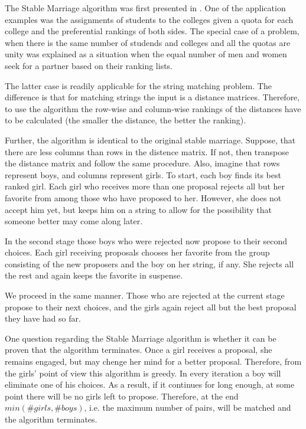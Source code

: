\documentclass[a4paper,11pt]{article}
\begin{document}
The Stable Marriage algorithm was first presented in \cite{gale}. One of the application examples was the assignments of students to the colleges given a quota for each college and the preferential rankings of both sides. The special case of a problem, when there is the same number of studends and colleges and all the quotas are unity was explained as a situation when the equal number of men and women seek for a partner based on their ranking lists.

The latter case is readily applicable for the string matching problem. The difference is that for matching strings the input is a distance matrices. Therefore, to use the algorithm the row-wise and column-wise rankings of the distances have to be calculated (the smaller the distance, the better the ranking).

Further, the algorithm is identical to the original stable marriage. Suppose, that there are less columns than rows in the distence matrix. If not, then transpose the distance matrix and follow the same procedure. Also, imagine that rows represent boys, and columns represent girls. To start, each boy finds its best ranked girl. Each girl who receives more than one proposal rejects all but her favorite from among those who have proposed to her. However, she does not accept him yet, but keeps him on a string to allow for the possibility that someone better may come along later.

In the second stage those boys who were rejected now propose to their second choices. Each girl receiving proposals chooses her favorite from the group consisting of the new proposers and the boy on her string, if any. She rejects all the rest and again keeps the favorite in suspense.

We proceed in the same manner. Those who are rejected at the current stage propose to their next choices, and the girls again reject all but the best proposal they have had so far.

One question regarding the Stable Marriage algorithm is whether it can be proven that the algorithm terminates. Once a girl receives a proposal, she remains engaged, but may chenge her mind for a better proposal. Therefore, from the girls' point of view this algorithm is greedy. In every iteration a boy will eliminate one of his choices. As a result, if it continues for long enough, at some point there will be no girls left to propose. Therefore, at the end $min(\#girls, \#boys)$, i.e. the maximum number of pairs, will be matched and the algorithm terminates.
\end{document}
